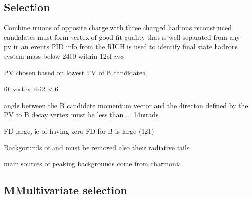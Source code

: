 

\subsection{Selection}

Combine muons of opposite charge with three charged hadrons
reconstruced candidates must form vertex of good fit quality that is well separated from any pv in
an events
PID info from the RICH is used to identify final state hadrons
\kpipi system mass below 2400\mev
\kk within 12\mev of $m\phi$

PV chosen based on lowest PV of B candidateo


fit vertex chi2 < 6

angle between the B candidate momentum vector and the directon defined by the PV to B decay vertex
must be less than ... 14mrads

FD \chisq large, ie \chisq of having zero FD for B is large (121)

Backgorunds of \jpsi and \psitwos must be removed
also their radiative tails

main sources of peaking backgrounds come from charmonia




\subsection{MMultivariate selection}


